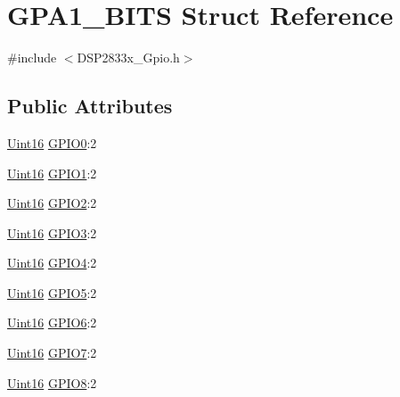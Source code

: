 \hypertarget{struct_g_p_a1___b_i_t_s}{}\section{G\+P\+A1\+\_\+\+B\+I\+T\+S Struct Reference}
\label{struct_g_p_a1___b_i_t_s}


{\ttfamily \#include $<$D\+S\+P2833x\+\_\+\+Gpio.\+h$>$}

\subsection*{Public Attributes}
\begin{DoxyCompactItemize}
\item 
\hyperlink{_d_s_p2833x___device_8h_a59a9f6be4562c327cbfb4f7e8e18f08b}{Uint16} \hyperlink{struct_g_p_a1___b_i_t_s_ad770aeb6125d2434bdc6a96e8164a094}{G\+P\+I\+O0}\+:2
\item 
\hyperlink{_d_s_p2833x___device_8h_a59a9f6be4562c327cbfb4f7e8e18f08b}{Uint16} \hyperlink{struct_g_p_a1___b_i_t_s_a72883a1bd144c6c9cd93a39d3763d0d8}{G\+P\+I\+O1}\+:2
\item 
\hyperlink{_d_s_p2833x___device_8h_a59a9f6be4562c327cbfb4f7e8e18f08b}{Uint16} \hyperlink{struct_g_p_a1___b_i_t_s_a017782b584b6b4f753cfbe21cfb3e148}{G\+P\+I\+O2}\+:2
\item 
\hyperlink{_d_s_p2833x___device_8h_a59a9f6be4562c327cbfb4f7e8e18f08b}{Uint16} \hyperlink{struct_g_p_a1___b_i_t_s_add0fdcb0791f81ad95711e1c1ce3367a}{G\+P\+I\+O3}\+:2
\item 
\hyperlink{_d_s_p2833x___device_8h_a59a9f6be4562c327cbfb4f7e8e18f08b}{Uint16} \hyperlink{struct_g_p_a1___b_i_t_s_ad4383f9004c70dee3fdf5983374bf51d}{G\+P\+I\+O4}\+:2
\item 
\hyperlink{_d_s_p2833x___device_8h_a59a9f6be4562c327cbfb4f7e8e18f08b}{Uint16} \hyperlink{struct_g_p_a1___b_i_t_s_a017d53ff1b943ede86bfdd535bb2fbc3}{G\+P\+I\+O5}\+:2
\item 
\hyperlink{_d_s_p2833x___device_8h_a59a9f6be4562c327cbfb4f7e8e18f08b}{Uint16} \hyperlink{struct_g_p_a1___b_i_t_s_ab2d5ab606730a1401600e11eb15b9619}{G\+P\+I\+O6}\+:2
\item 
\hyperlink{_d_s_p2833x___device_8h_a59a9f6be4562c327cbfb4f7e8e18f08b}{Uint16} \hyperlink{struct_g_p_a1___b_i_t_s_ad3d2fcdf697e1df9c62d1f62ddb23cbd}{G\+P\+I\+O7}\+:2
\item 
\hyperlink{_d_s_p2833x___device_8h_a59a9f6be4562c327cbfb4f7e8e18f08b}{Uint16} \hyperlink{struct_g_p_a1___b_i_t_s_adba7f5d08867e0325d9a18af346e0842}{G\+P\+I\+O8}\+:2

\end{DoxyCompactItemize}

